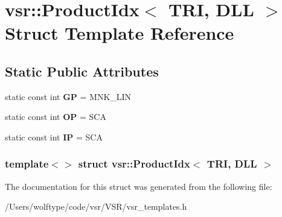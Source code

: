 \hypertarget{structvsr_1_1_product_idx_3_01_t_r_i_00_01_d_l_l_01_4}{\section{vsr\-:\-:Product\-Idx$<$ T\-R\-I, D\-L\-L $>$ Struct Template Reference}
\label{structvsr_1_1_product_idx_3_01_t_r_i_00_01_d_l_l_01_4}
}
\subsection*{Static Public Attributes}
\begin{DoxyCompactItemize}
\item 
\hypertarget{structvsr_1_1_product_idx_3_01_t_r_i_00_01_d_l_l_01_4_af5b957f82fdab9e7fc9ebb9447959d87}{static const int {\bfseries G\-P} = M\-N\-K\-\_\-\-L\-I\-N}\label{structvsr_1_1_product_idx_3_01_t_r_i_00_01_d_l_l_01_4_af5b957f82fdab9e7fc9ebb9447959d87}

\item 
\hypertarget{structvsr_1_1_product_idx_3_01_t_r_i_00_01_d_l_l_01_4_ad11a99b90dc8e4e15ad1729d6355fbcc}{static const int {\bfseries O\-P} = S\-C\-A}\label{structvsr_1_1_product_idx_3_01_t_r_i_00_01_d_l_l_01_4_ad11a99b90dc8e4e15ad1729d6355fbcc}

\item 
\hypertarget{structvsr_1_1_product_idx_3_01_t_r_i_00_01_d_l_l_01_4_afc23ff845f37564db4d8439dd50be044}{static const int {\bfseries I\-P} = S\-C\-A}\label{structvsr_1_1_product_idx_3_01_t_r_i_00_01_d_l_l_01_4_afc23ff845f37564db4d8439dd50be044}

\end{DoxyCompactItemize}
\subsubsection*{template$<$$>$ struct vsr\-::\-Product\-Idx$<$ T\-R\-I, D\-L\-L $>$}



The documentation for this struct was generated from the following file\-:\begin{DoxyCompactItemize}
\item 
/\-Users/wolftype/code/vsr/\-V\-S\-R/vsr\-\_\-templates.\-h\end{DoxyCompactItemize}
